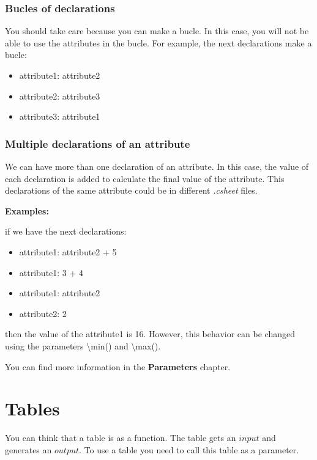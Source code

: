 \documentclass[11pt,a4paper,openright,oneside]{book}
\newenvironment{exs}
{
  \setlength{\parindent}{0cm}
  \large \textbf{Examples:} \normalsize
}
{}
\begin{document}
\subsubsection{Bucles of declarations}

You should take care because you can make a bucle. In this case, you will not be able to use the attributes in the bucle. For example, the next declarations make a bucle:
\begin{itemize}
  \item \textsf{attribute1: attribute2}
  \item \textsf{attribute2: attribute3}
  \item \textsf{attribute3: attribute1}
\end{itemize}

\subsubsection{Multiple declarations of an attribute}

We can have more than one declaration of an attribute. In this case, the value of each declaration is added to calculate the final value of the attribute. This declarations of the same attribute could be in different \textit{.csheet} files.

\begin{exs}
if we have the next declarations:
\begin{itemize}
  \item \textsf{attribute1: attribute2 + 5}
  \item \textsf{attribute1: 3 + 4}
  \item \textsf{attribute1: attribute2}
  \item \textsf{attribute2: 2}
\end{itemize}
then the value of the \textsf{attribute1} is \textsf{16}.
\end{exs}
However, this behavior can be changed using the parameters \textsf{\textbackslash min()} and \textsf{\textbackslash max()}.

You can find more information in the \textbf{Parameters} chapter.

\section{Tables}
You can think that a table is as a function. The table gets an $input$ and generates an $output$. To use a table you need to call this table as a parameter.
\end{document}
